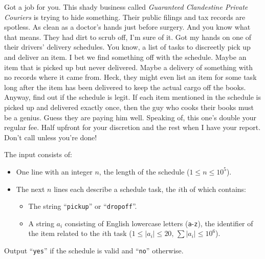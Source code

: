 

\newcommand{\maxn}{10^5}

Got a job for you. 
This shady business called \emph{Guaranteed Clandestine Private Couriers} is trying to hide something.
Their public filings and tax records are spotless.
As clean as a doctor's hands just before surgery.
And you know what that means.
They had dirt to scrub off, I'm sure of it.
Got my hands on one of their drivers' delivery schedules.
You know, a list of tasks to discreetly pick up and deliver an item.
I bet we find something off with the schedule.
Maybe an item that is picked up but never delivered.
Maybe a delivery of something with no records where it came from.
Heck, they might even list an item for some task long after the item has been delivered to keep the actual cargo off the books.
Anyway, find out if the schedule is legit.
If each item mentioned in the schedule is picked up and delivered exactly once, then the guy who cooks their books must be a genius.
Guess they are paying him well.
Speaking of, this one's double your regular fee. 
Half upfront for your discretion and the rest when I have your report.
Don't call unless you're done!

\begin{Input}
    The input consists of:
    \begin{itemize}
        \item One line with an integer $n$, the length of the schedule ($1\leq n\leq \maxn$).
        \item The next $n$ lines each describe a schedule task, the $i$th of which contains:
        \begin{itemize}
            \item The string ``\texttt{pickup}'' or ``\texttt{dropoff}''.
            \item A string $a_i$ consisting of English lowercase letters (\texttt a-\texttt z), the identifier of the item related to the $i$th task ($1\leq |a_i| \leq 20$, $\sum |a_i| \leq 10^6$).
        \end{itemize}
    \end{itemize}
\end{Input}

\begin{Output}
    Output ``\texttt{yes}'' if the schedule is valid and ``\texttt{no}'' otherwise.
\end{Output}
